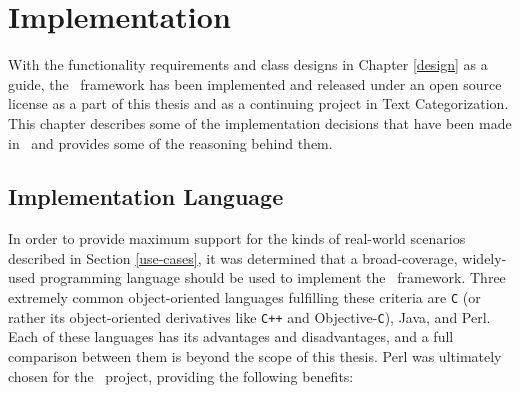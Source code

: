 \chapter{Implementation}
\label{Implementation}

With the functionality requirements and class designs in Chapter
\ref{design} as a guide, the \aicat\ framework has been implemented
and released under an open source license \cite{raymond:97,dibona:99} as a
part of this thesis and as a continuing project in Text
Categorization.  This chapter describes some of the implementation
decisions that have been made in \aicat\, and provides some of the
reasoning behind them.

\section{Implementation Language}
\label{imp-language}

In order to provide maximum support for the kinds of real-world
scenarios described in Section \ref{use-cases}, it was determined that
a broad-coverage, widely-used programming language should be used to
implement the \aicat\ framework.  Three extremely common
object-oriented languages fulfilling these criteria are \texttt{C} (or
rather its object-oriented derivatives like \texttt{C++} and
Objective-\texttt{C}), Java, and Perl.  Each of these languages has
its advantages and disadvantages, and a full comparison between them
is beyond the scope of this thesis.  Perl was ultimately chosen for
the \aicat\ project, providing the following benefits:

